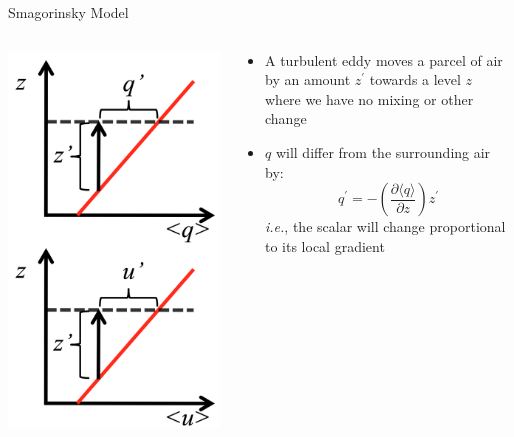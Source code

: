 \begin{frame}{Smagorinsky Model}
\begin{columns}[T]
	\begin{column}{.26\textwidth}
    	\begin{minipage}[c][.5\textheight][c]{\linewidth}
    		\includegraphics[width=1\textwidth]{mixing_length}
    	\end{minipage}
    \end{column}
    \begin{column}{.74\textwidth}
    	\begin{itemize}
    		\item A turbulent eddy moves a parcel of air by an amount $z^\prime$ towards a level $z$ where we have no mixing or other change
    		\item $q$ will differ from the surrounding air by:
    		$$q^\prime = -\left(\frac{\partial \langle q\rangle}{\partial z}\right)z^\prime$$
    		\textit{i.e.}, the scalar will change proportional to its local gradient
    	\end{itemize}	
    \end{column}
  \end{columns}


\end{frame}
